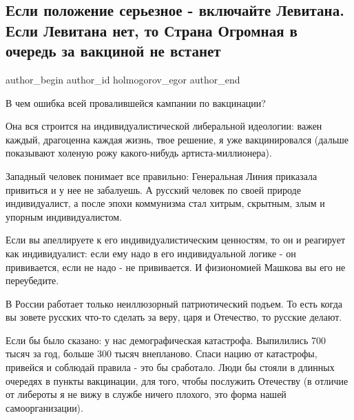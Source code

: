  
 
 
 
 
 
\subsection{Если положение серьезное - включайте Левитана. Если Левитана нет, то Страна Огромная в очередь за вакциной не встанет}
\label{sec:17_06_2021.fb.holmogorov_egor.1.levitan_vaccinacia}
\ifcmt
 author_begin
   author_id holmogorov_egor
 author_end
\fi

В чем ошибка всей провалившейся кампании по вакцинации? 

Она вся строится на индивидуалистической либеральной идеологии: важен каждый,
драгоценна каждая жизнь, твое решение, я уже вакцинировался (дальше показывают
холеную рожу какого-нибудь артиста-миллионера).

Западный человек понимает все правильно: Генеральная Линия приказала привиться
и у нее не забалуешь. А русский человек по своей природе индивидуалист, а после
эпохи коммунизма стал хитрым, скрытным, злым и упорным индивидуалистом.

Если вы апеллируете к его индивидуалистическим ценностям, то он и реагирует как
индивидуалист: если ему надо в его индивидуальной логике - он прививается, если
не надо - не прививается. И физиономией Машкова вы его не переубедите.

В России работает только неиллюзорный патриотический подъем. То есть когда вы
зовете русских что-то сделать за веру, царя и Отечество, то русские делают.

Если бы было сказано: у нас демографическая катастрофа. Выпилились 700 тысяч за
год, больше 300 тысяч внепланово. Спаси нацию от катастрофы, привейся и
соблюдай правила - это бы сработало. Люди бы стояли в длинных очередях в пункты
вакцинации, для того, чтобы послужить Отечеству (в отличие от либероты я не
вижу в службе ничего плохого, это форма нашей самоорганизации).

